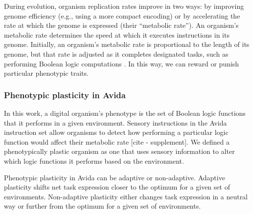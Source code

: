 
During evolution, organism replication rates improve in two ways: by improving genome efficiency (e.g., using a more compact encoding) or by accelerating the rate at which the genome is expressed (their ``metabolic rate'').
An organism's metabolic rate determines the speed at which it executes instructions in its genome.
Initially, an organism's metabolic rate is proportional to the length of its genome, but that rate is adjusted as it completes designated tasks, such as performing Boolean logic computations \citep{ofria_avida:_2009}.
In this way, we can reward or punish particular phenotypic traits. 

\subsubsection{Phenotypic plasticity in Avida}


In this work, a digital organism's phenotype is the set of Boolean logic functions that it performs in a given environment.
Sensory instructions in the Avida instruction set allow organisms to detect how performing a particular logic function would affect their metabolic rate [cite - supplement]. 
We defined a phenotypically plastic organism as one that uses sensory information to alter which logic functions it performs based on the environment.

Phenotypic plasticity in Avida can be adaptive or non-adaptive.
Adaptive plasticity shifts net task expression closer to the optimum for a given set of environments.
Non-adaptive plasticity either changes task expression in a neutral way or further from the optimum for a given set of environments.



